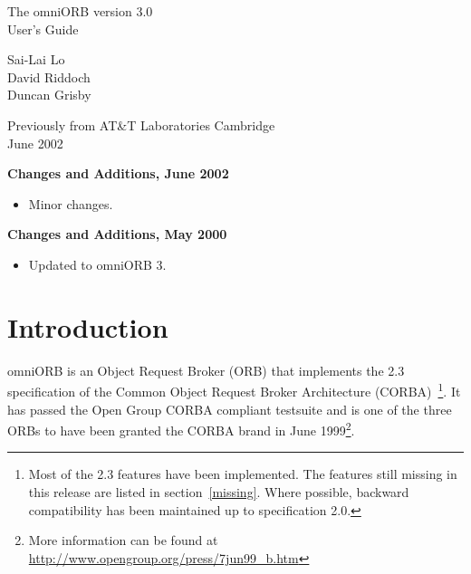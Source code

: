 \documentclass[11pt,twoside,a4paper]{book}
\newcommand{\weburl}{\url}
\begin{document}
\pagestyle{empty}


\begin{center}

\vfill

{ \Huge
The omniORB version 3.0\\[4mm]
User's Guide
}

\vfill

{ \Large
Sai-Lai Lo\\[2ex]
%
David Riddoch\\[2ex]
%
Duncan Grisby\\[4ex]
%
}

Previously from AT\&T Laboratories Cambridge\\


\vfill
\vfill
June 2002
\vfill

\end{center}

\clearpage

{\Large \bf Changes and Additions, June 2002}
\begin{itemize}
\item Minor changes.
\end{itemize}

\vspace{2\baselineskip}

{\Large \bf Changes and Additions, May 2000}
\begin{itemize}
\item Updated to omniORB 3.
\end{itemize}


\cleardoublepage

\tableofcontents

\cleardoublepage

\pagestyle{headings}


\mainmatter

\chapter{Introduction}

omniORB is an Object Request Broker (ORB) that implements the 2.3
specification of the Common Object Request Broker Architecture
(CORBA)~\cite{corba23-spec}\footnote{Most of the 2.3 features have
been implemented. The features still missing in this release are listed
in section~\ref{missing}. Where possible, backward compatibility has
been maintained up to specification 2.0.}. It has passed the Open
Group CORBA compliant testsuite and is one of the three ORBs to have
been granted the CORBA brand in June 1999\footnote{More information
can be found at \weburl{http://www.opengroup.org/press/7jun99_b.htm}}.
\end{document}
